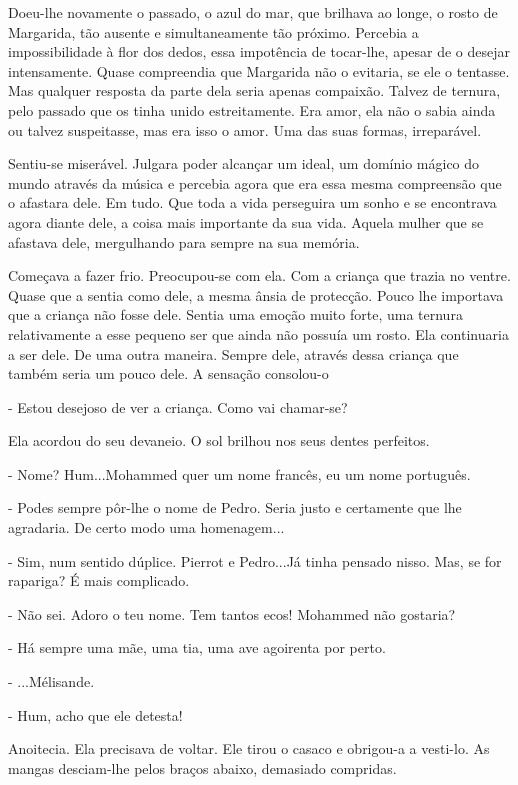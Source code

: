 Doeu-lhe novamente o passado, o azul do mar, que brilhava ao longe, o
rosto de Margarida, tão ausente e simultaneamente tão próximo. Percebia
a impossibilidade à flor dos dedos, essa impotência de tocar-lhe, apesar
de o desejar intensamente. Quase compreendia que Margarida não o
evitaria, se ele o tentasse. Mas qualquer resposta da parte dela seria
apenas compaixão. Talvez de ternura, pelo passado que os tinha unido
estreitamente. Era amor, ela não o sabia ainda ou talvez suspeitasse,
mas era isso o amor. Uma das suas formas, irreparável.

Sentiu-se miserável. Julgara poder alcançar um ideal, um domínio mágico
do mundo através da música e percebia agora que era essa mesma
compreensão que o afastara dele. Em tudo. Que toda a vida perseguira um
sonho e se encontrava agora diante dele, a coisa mais importante da sua
vida. Aquela mulher que se afastava dele, mergulhando para sempre na sua
memória.

Começava a fazer frio. Preocupou-se com ela. Com a criança que trazia no
ventre. Quase que a sentia como dele, a mesma ânsia de protecção. Pouco
lhe importava que a criança não fosse dele. Sentia uma emoção muito
forte, uma ternura relativamente a esse pequeno ser que ainda não
possuía um rosto. Ela continuaria a ser dele. De uma outra maneira.
Sempre dele, através dessa criança que também seria um pouco dele. A
sensação consolou-o

- Estou desejoso de ver a criança. Como vai chamar-se?

Ela acordou do seu devaneio. O sol brilhou nos seus dentes perfeitos.

- Nome? Hum...Mohammed quer um nome francês, eu um nome português.

- Podes sempre pôr-lhe o nome de Pedro. Seria justo e certamente que lhe
agradaria. De certo modo uma homenagem...

- Sim, num sentido dúplice. Pierrot e Pedro...Já tinha pensado nisso.
Mas, se for rapariga? É mais complicado.

- Não sei. Adoro o teu nome. Tem tantos ecos! Mohammed não gostaria?

- Há sempre uma mãe, uma tia, uma ave agoirenta por perto.

- ...Mélisande.

- Hum, acho que ele detesta!

Anoitecia. Ela precisava de voltar. Ele tirou o casaco e obrigou-a a
vesti-lo. As mangas desciam-lhe pelos braços abaixo, demasiado
compridas.

